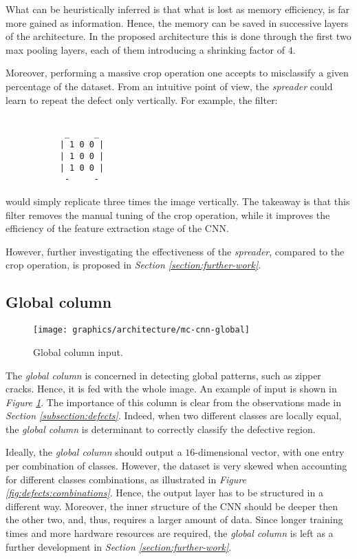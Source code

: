         \par{
            What can be heuristically inferred is that what is lost as memory efficiency, is far more gained as information. Hence, the memory can be saved in successive layers of the architecture. In the proposed architecture this is done through the first two max pooling layers, each of them introducing a shrinking factor of $4$.
        }
        \par{
            Moreover, performing a massive crop operation one accepts to misclassify a given percentage of the dataset. From an intuitive point of view, the \emph{spreader} could learn to repeat the defect only vertically.
            For example, the filter:
        }
        \par{
        \begin{BVerbatim}

            _     _
           | 1 0 0 |
           | 1 0 0 |
           | 1 0 0 |
            -     -
       \end{BVerbatim}
        }
        \par{
            would simply replicate three times the image vertically. The takeaway is that this filter removes the manual tuning of the crop operation, while it improves the efficiency of the feature extraction stage of the CNN.
        }
        \par{
            However, further investigating the effectiveness of the \emph{spreader}, compared to the crop operation, is proposed in \emph{Section \ref{section:further-work}}.
        }
    \subsection{Global column}\label{section:global-column}
        \begin{figure}
            \centering
            \texttt{[image: graphics/architecture/mc-cnn-global]}
            \caption{Global column input.}\label{fig:mc-cnn:global-input}
        \end{figure}
        \par{
            The \emph{global column} is concerned in detecting global patterns, such as zipper cracks. Hence, it is fed with the whole image. An example of input is shown in \emph{Figure \ref{fig:mc-cnn:global-input}}. The importance of this column is clear from the observations made in \emph{Section \ref{subsection:defects}}. Indeed, when two different classes are locally equal, the \emph{global column} is determinant to correctly classify the defective region.
        }
        \par{
            Ideally, the \emph{global column} should output a $16$-dimensional vector, with one entry per combination of classes. However, the dataset is very skewed when accounting for different classes combinations, as illustrated in \emph{Figure \ref{fig:defects:combinations}}. Hence, the output layer has to be structured in a different way. Moreover, the inner structure of the CNN should be deeper then the other two, and, thus, requires a larger amount of data. Since longer training times and more hardware resources are required, the \emph{global column} is left as a further development in \emph{Section \ref{section:further-work}}.
        }
